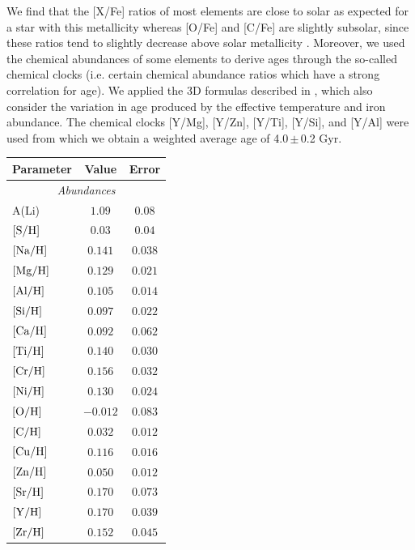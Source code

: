\documentclass[fleqn,usenatbib]{mnras}
\newcommand{\Tstarage}{4.0\,$\pm$\,0.2 Gyr}
\begin{document}
We find that the [X/Fe] ratios of most elements are close to solar as expected for a star with this metallicity whereas [O/Fe] and [C/Fe] are slightly subsolar, since these ratios tend to slightly decrease above solar metallicity \cite[e.g.][]{Bertrandelis-15,Franchini2020}. Moreover, we used the chemical abundances of some elements to derive ages through the so-called chemical clocks (i.e. certain chemical abundance ratios which have a strong correlation for age). We applied the 3D formulas described in \citet{Delgado-19}, which also consider the variation in age produced by the effective temperature and iron abundance. The chemical clocks [Y/Mg], [Y/Zn], [Y/Ti], [Y/Si], and [Y/Al] were used from which we obtain a weighted average age of \Tstarage{}.
\begin{table}
    \centering
    \begin{tabular}{lcc}
        \hline
        \hline
        Parameter & Value & Error \\
        \hline
        \hline
        \multicolumn{3}{c}{\it Abundances}\\
        A(Li) & $1.09$ & $0.08$ \\
        $[\rm{S}/\rm{H}]$ & $0.03$ & $0.04$ \\
        $[\rm{Na}/\rm{H}]$ & $0.141$ & $0.038$ \\
        $[\rm{Mg}/\rm{H}]$ & $0.129$ & $0.021$ \\
        $[\rm{Al}/\rm{H}]$ & $0.105$ & $0.014$ \\
        $[\rm{Si}/\rm{H}]$ & $0.097$ & $0.022$ \\
        $[\rm{Ca}/\rm{H}]$ & $0.092$ & $0.062$ \\
        $[\rm{Ti}/\rm{H}]$ & $0.140$ & $0.030$ \\
        $[\rm{Cr}/\rm{H}]$ & $0.156$ & $0.032$ \\
        $[\rm{Ni}/\rm{H}]$ & $0.130$ & $0.024$ \\
        $[\rm{O}/\rm{H}]$ & $-0.012$ & $0.083$ \\
        $[\rm{C}/\rm{H}]$ & $0.032$ & $0.012$ \\
        $[\rm{Cu}/\rm{H}]$ & $   0.116 $ & $  0.016 $ \\
        $[\rm{Zn}/\rm{H}]$ & $   0.050 $ & $  0.012 $ \\
        $[\rm{Sr}/\rm{H}]$ & $   0.170 $ & $  0.073 $ \\
        $[\rm{Y}/\rm{H}]$ & $    0.170 $ & $  0.039 $ \\
        $[\rm{Zr}/\rm{H}]$ & $   0.152 $ & $  0.045 $ \\

\end{tabular}
\end{table}
\end{document}
